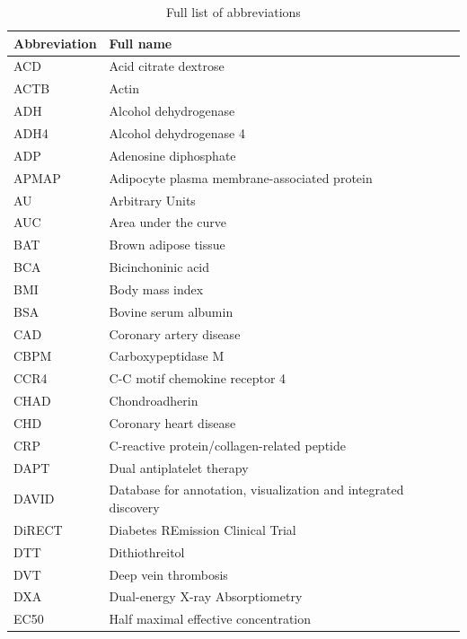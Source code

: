 \documentclass[11pt,twoside]{bristolthesis}
\begin{document}
  \hypersetup{linkcolor=black}
  {
  \setcounter{tocdepth}{2}
  \setcounter{secnumdepth}{2}
  \tableofcontents
  }

  \listoftables

  \listoffigures
  \begin{abbreviations}
    \begin{longtable}[t]{ll}
    \caption{Full list of abbreviations}\\
    \toprule
    Abbreviation & Full name\\
    \midrule
    ACD & Acid citrate dextrose\\
    ACTB & Actin\\
    ADH & Alcohol dehydrogenase\\
    ADH4 & Alcohol dehydrogenase 4\\
    ADP & Adenosine diphosphate\\
    \addlinespace
    APMAP & Adipocyte plasma membrane-associated protein\\
    AU & Arbitrary Units\\
    AUC & Area under the curve\\
    BAT & Brown adipose tissue\\
    BCA & Bicinchoninic acid\\
    \addlinespace
    BMI & Body mass index\\
    BSA & Bovine serum albumin\\
    CAD & Coronary artery disease\\
    CBPM & Carboxypeptidase M\\
    CCR4 & C-C motif chemokine receptor 4\\
    \addlinespace
    CHAD & Chondroadherin\\
    CHD & Coronary heart disease\\
    CRP & C-reactive protein/collagen-related peptide\\
    DAPT & Dual antiplatelet therapy\\
    DAVID & Database for annotation, visualization and integrated discovery\\
    \addlinespace
    DiRECT & Diabetes REmission Clinical Trial\\
    DTT & Dithiothreitol\\
    DVT & Deep vein thrombosis\\
    DXA & Dual-energy X-ray Absorptiometry\\
    EC50 & Half maximal effective concentration\\

\end{longtable}
\end{abbreviations}
\end{document}

